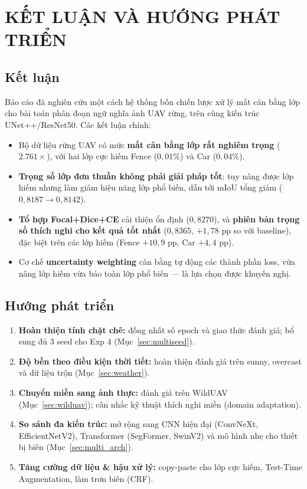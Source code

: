 \chapter{KẾT LUẬN VÀ HƯỚNG PHÁT TRIỂN}
\label{ch:ket_luan}

\section{Kết luận}

Báo cáo đã nghiên cứu một cách hệ thống bốn chiến lược xử lý mất cân bằng lớp cho bài
toán phân đoạn ngữ nghĩa ảnh UAV rừng, trên cùng kiến trúc UNet++/ResNet50. Các kết
luận chính:

\begin{itemize}[leftmargin=1.4cm]
  \item Bộ dữ liệu rừng UAV có mức \textbf{mất cân bằng lớp rất nghiêm trọng}
  ($2.761\times$), với hai lớp cực hiếm Fence ($0{,}01\%$) và Car ($0{,}04\%$).
  \item \textbf{Trọng số lớp đơn thuần không phải giải pháp tốt}: tuy nâng được lớp
  hiếm nhưng làm giảm hiệu năng lớp phổ biến, dẫn tới mIoU tổng giảm
  ($0{,}8187 \rightarrow 0{,}8142$).
  \item \textbf{Tổ hợp Focal+Dice+CE} cải thiện ổn định ($0{,}8270$), và
  \textbf{phiên bản trọng số thích nghi cho kết quả tốt nhất} ($0{,}8365$,
  $+1{,}78$ pp so với baseline), đặc biệt trên các lớp hiếm (Fence $+10{,}9$ pp,
  Car $+4{,}4$ pp).
  \item Cơ chế \textbf{uncertainty weighting} cân bằng tự động các thành phần loss,
  vừa nâng lớp hiếm vừa bảo toàn lớp phổ biến --- là lựa chọn được khuyến nghị.
\end{itemize}

\section{Hướng phát triển}
\label{sec:huong_morong}

\begin{enumerate}[leftmargin=1.4cm]
  \item \textbf{Hoàn thiện tính chặt chẽ:} đồng nhất số epoch và giao thức đánh giá;
  bổ sung đủ 3 seed cho Exp 4 (Mục~\ref{sec:multiseed}).
  \item \textbf{Độ bền theo điều kiện thời tiết:} hoàn thiện đánh giá trên sunny,
  overcast và dữ liệu trộn (Mục~\ref{sec:weather}).
  \item \textbf{Chuyển miền sang ảnh thực:} đánh giá trên WildUAV
  (Mục~\ref{sec:wilduav}); cân nhắc kỹ thuật thích nghi miền (domain adaptation).
  \item \textbf{So sánh đa kiến trúc:} mở rộng sang CNN hiện đại (ConvNeXt,
  EfficientNetV2), Transformer (SegFormer, SwinV2) và mô hình nhẹ cho thiết bị biên
  (Mục~\ref{sec:multi_arch}).
  \item \textbf{Tăng cường dữ liệu \& hậu xử lý:} copy-paste cho lớp cực hiếm,
  Test-Time Augmentation, làm trơn biên (CRF).
\end{enumerate}
